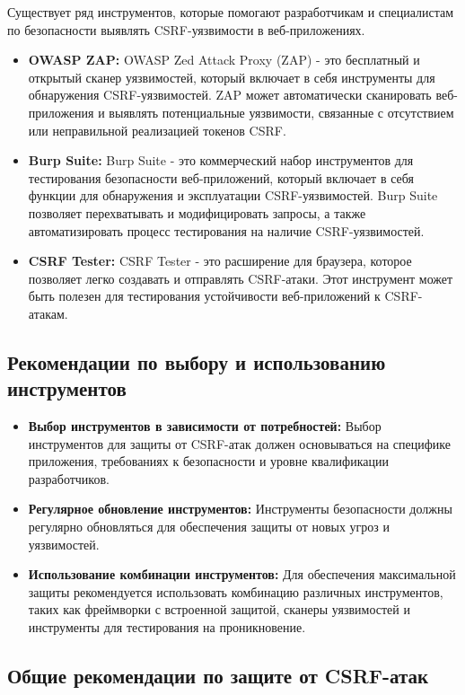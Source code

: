 \documentclass[a4paper,12pt]{diplom}
\begin{document}
	 Существует ряд инструментов, которые помогают разработчикам и специалистам по безопасности выявлять CSRF-уязвимости в веб-приложениях. 
	 
	 \begin{itemize}
	 	\item \textbf{OWASP ZAP:}  OWASP Zed Attack Proxy (ZAP) - это бесплатный и открытый сканер уязвимостей, который включает в себя инструменты для обнаружения CSRF-уязвимостей. ZAP может автоматически сканировать веб-приложения и выявлять потенциальные уязвимости, связанные с отсутствием или неправильной реализацией токенов CSRF.
	 	\item \textbf{Burp Suite:} Burp Suite - это коммерческий набор инструментов для тестирования безопасности веб-приложений, который включает в себя функции для обнаружения и эксплуатации CSRF-уязвимостей. Burp Suite позволяет перехватывать и модифицировать запросы, а также автоматизировать процесс тестирования на наличие CSRF-уязвимостей.
	 	\item \textbf{CSRF Tester:} CSRF Tester - это расширение для браузера, которое позволяет легко создавать и отправлять CSRF-атаки. Этот инструмент может быть полезен для тестирования устойчивости веб-приложений к CSRF-атакам.
	 \end{itemize}
	 
	 \subsection{Рекомендации по выбору и использованию инструментов}
	 
	 \begin{itemize}
	 \item \textbf{Выбор инструментов в зависимости от потребностей:}  Выбор инструментов для защиты от CSRF-атак должен основываться на специфике приложения, требованиях к безопасности и уровне квалификации разработчиков.
	 \item \textbf{Регулярное обновление инструментов:}  Инструменты безопасности должны регулярно обновляться для обеспечения защиты от новых угроз и уязвимостей.
	 \item \textbf{Использование комбинации инструментов:}  Для обеспечения максимальной защиты рекомендуется использовать комбинацию различных инструментов, таких как фреймворки с встроенной защитой, сканеры уязвимостей и инструменты для тестирования на проникновение.
 	 \end{itemize}
	 
	 \subsection{Общие рекомендации по защите от CSRF-атак}
	 
\end{document}
